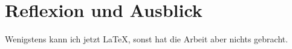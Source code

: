 \section{Reflexion und Ausblick}
Wenigstens kann ich jetzt \LaTeX, sonst hat die Arbeit aber nichts gebracht.
